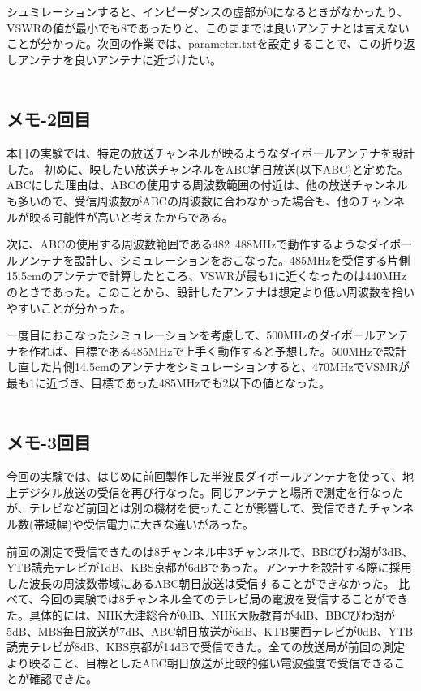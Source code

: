 \documentclass[dvipdfmx,autodetect-engine,titlepage]{jsarticle}
\begin{document}
シュミレーションすると、インピーダンスの虚部が0になるときがなかったり、VSWRの値が最小でも8であったりと、このままでは良いアンテナとは言えないことが分かった。次回の作業では、parameter.txtを設定することで、この折り返しアンテナを良いアンテナに近づけたい。\\\\


\subsection{メモ-2回目}
本日の実験では、特定の放送チャンネルが映るようなダイポールアンテナを設計した。
初めに、映したい放送チャンネルをABC朝日放送(以下ABC)と定めた。ABCにした理由は、ABCの使用する周波数範囲の付近は、他の放送チャンネルも多いので、受信周波数がABCの周波数に合わなかった場合も、他のチャンネルが映る可能性が高いと考えたからである。

次に、ABCの使用する周波数範囲である482~488MHzで動作するようなダイポールアンテナを設計し、シミュレーションをおこなった。485MHzを受信する片側15.5cmのアンテナで計算したところ、VSWRが最も1に近くなったのは440MHzのときであった。このことから、設計したアンテナは想定より低い周波数を拾いやすいことが分かった。

一度目におこなったシミュレーションを考慮して、500MHzのダイポールアンテナを作れば、目標である485MHzで上手く動作すると予想した。500MHzで設計し直した片側14.5cmのアンテナをシミュレーションすると、470MHzでVSMRが最も1に近づき、目標であった485MHzでも2以下の値となった。\\\\

\subsection{メモ-3回目}
今回の実験では、はじめに前回製作した半波長ダイポールアンテナを使って、地上デジタル放送の受信を再び行なった。同じアンテナと場所で測定を行なったが、テレビなど前回とは別の機材を使ったことが影響して、受信できたチャンネル数(帯域幅)や受信電力に大きな違いがあった。

前回の測定で受信できたのは8チャンネル中3チャンネルで、BBCびわ湖が3dB、YTB読売テレビが1dB、KBS京都が6dBであった。アンテナを設計する際に採用した波長の周波数帯域にあるABC朝日放送は受信することができなかった。
比べて、今回の実験では8チャンネル全てのテレビ局の電波を受信することができた。具体的には、NHK大津総合が0dB、NHK大阪教育が4dB、BBCびわ湖が5dB、MBS毎日放送が7dB、ABC朝日放送が6dB、KTB関西テレビが0dB、YTB読売テレビが8dB、KBS京都が14dBで受信できた。全ての放送局が前回の測定より映ること、目標としたABC朝日放送が比較的強い電波強度で受信できることが確認できた。
\end{document}

